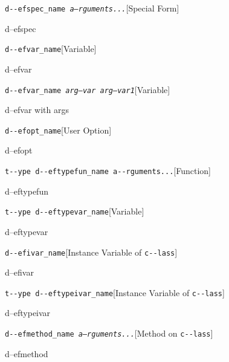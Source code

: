 \documentclass{book}
\begin{document}
\noindent\texttt{d{-}{-}efspec\_name \EmbracOn{}\textnormal{\textsl{a--rguments...}}\EmbracOff{}}\hfill[Special Form]



%
d--efspec

\noindent\texttt{d{-}{-}efvar\_name}\hfill[Variable]



%
d--efvar

\noindent\texttt{d{-}{-}efvar\_name \EmbracOn{}\textnormal{\textsl{arg--var arg--var1}}\EmbracOff{}}\hfill[Variable]



%
d--efvar with args

\noindent\texttt{d{-}{-}efopt\_name}\hfill[User Option]



%
d--efopt

\noindent\texttt{t{-}{-}ype d{-}{-}eftypefun\_name a{-}{-}rguments...}\hfill[Function]



%
d--eftypefun

\noindent\texttt{t{-}{-}ype d{-}{-}eftypevar\_name}\hfill[Variable]



%
d--eftypevar

\noindent\texttt{d{-}{-}efivar\_name}\hfill[Instance Variable of \texttt{c{-}{-}lass}]



%
d--efivar

\noindent\texttt{t{-}{-}ype d{-}{-}eftypeivar\_name}\hfill[Instance Variable of \texttt{c{-}{-}lass}]



%
d--eftypeivar

\noindent\texttt{d{-}{-}efmethod\_name \EmbracOn{}\textnormal{\textsl{a--rguments...}}\EmbracOff{}}\hfill[Method on \texttt{c{-}{-}lass}]



%
d--efmethod
\end{document}

